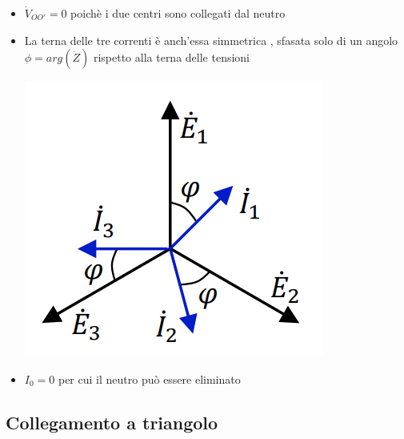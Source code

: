 \documentclass{article}
\theoremstyle{definition}
\begin{document}
\begin{itemize}
    \item $\dot{V}_{OO'}=0$ poichè i due centri sono collegati dal neutro
    \item La terna delle tre correnti è anch'essa simmetrica , sfasata solo di un angolo $\phi=arg(\dot{Z})$ rispetto alla terna delle tensioni
    \begin{center}
        \includegraphics[scale=0.20]{immagini/phi.png}
    \end{center}
    \item $I_0=0$ per cui il neutro può essere eliminato
\end{itemize}
\subsection{Collegamento a triangolo}
\end{document}

